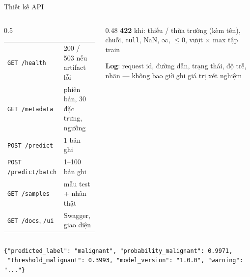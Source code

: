 \documentclass[aspectratio=169,12pt]{beamer}
\begin{document}
\begin{frame}[fragile]{Thiết kế API}
  \begin{columns}[T]
    \begin{column}{0.5\textwidth}
      \footnotesize
      \begin{tabular}{@{}ll@{}}
        \toprule
        \texttt{GET /health} & 200 / \alert{503} nếu artifact lỗi \\
        \texttt{GET /metadata} & phiên bản, 30 đặc trưng, ngưỡng \\
        \texttt{POST /predict} & 1 bản ghi \\
        \texttt{POST /predict/batch} & 1--100 bản ghi \\
        \texttt{GET /samples} & mẫu test + nhãn thật \\
        \texttt{GET /docs}, \texttt{/ui} & Swagger, giao diện \\
        \bottomrule
      \end{tabular}
    \end{column}
    \begin{column}{0.48\textwidth}
      \small \textbf{422} khi: thiếu / thừa trường (kèm tên), chuỗi, \texttt{null}, NaN, $\infty$, $\le 0$, vượt
      \UpperFactor{}× max tập train
      \vspace{4pt}

      \textbf{Log}: request id, đường dẫn, trạng thái, độ trễ, nhãn --- \alert{không bao giờ} ghi giá trị xét nghiệm
    \end{column}
  \end{columns}
  \vspace{6pt}
\begin{lstlisting}
{"predicted_label": "malignant", "probability_malignant": 0.9971,
 "threshold_malignant": 0.3993, "model_version": "1.0.0", "warning": "..."}
\end{lstlisting}
\end{frame}
\end{document}
